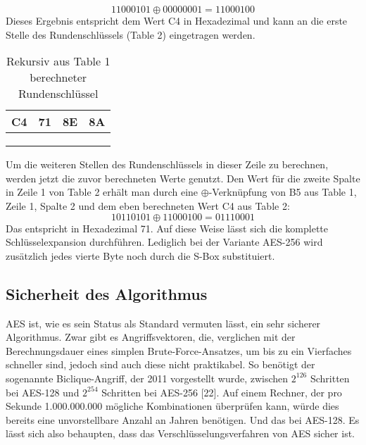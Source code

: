 \documentclass[conference,10pt,a4paper,twocolumn]{IEEEtran}
\begin{document}
\begin{equation}
11000101 \oplus 00000001 = 11000100
\end{equation}
Dieses Ergebnis entspricht dem Wert C4 in Hexadezimal und kann an die erste Stelle des Rundenschlüssels (Table 2) eingetragen werden.
\begin{table}[h!]
\centering
\caption{Rekursiv aus Table 1 berechneter Rundenschlüssel}
\resizebox{8cm}{!} {
  \begin{tabular}{ | p{1cm} | p{1cm} | p{1cm} | p{1cm} |}
    \hline
    C4 & 71 & 8E  & 8A \\ \hline
     &  &  & \\ \hline
     &  &  & \\ \hline
     &  &  & \\
    \hline
  \end{tabular}
}
\end{table}
\linebreak
Um die weiteren Stellen des Rundenschlüssels in dieser Zeile zu berechnen, werden jetzt die zuvor berechneten Werte genutzt. Den Wert für die zweite Spalte in Zeile 1 von Table 2 erhält man durch eine \begin{math}\oplus\end{math}-Verknüpfung von B5 aus Table 1, Zeile 1, Spalte 2 und dem eben berechneten Wert C4 aus Table 2:
\begin{equation}
10110101 \oplus 11000100 = 01110001
\end{equation}
Das entspricht in Hexadezimal 71. Auf diese Weise lässt sich die komplette Schlüsselexpansion durchführen. Lediglich bei der Variante AES-256 wird zusätzlich jedes vierte Byte noch durch die S-Box substituiert.

\subsection{Sicherheit des Algorithmus}
AES ist, wie es sein Status als Standard vermuten lässt, ein sehr sicherer Algorithmus. Zwar gibt es Angriffsvektoren, die, verglichen mit der Berechnungsdauer eines simplen Brute-Force-Ansatzes, um bis zu ein Vierfaches schneller sind, jedoch sind auch diese nicht praktikabel. So benötigt der sogenannte Biclique-Angriff, der 2011 vorgestellt wurde, zwischen \begin{math}2^{126}\end{math} Schritten bei AES-128 und \begin{math}2^{254}\end{math} Schritten bei AES-256 [22]. Auf einem Rechner, der pro Sekunde 1.000.000.000 mögliche Kombinationen überprüfen kann, würde dies bereits eine unvorstellbare Anzahl an Jahren benötigen. Und das bei AES-128. Es lässt sich also behaupten, dass das Verschlüsselungsverfahren von AES sicher ist.
\end{document}
